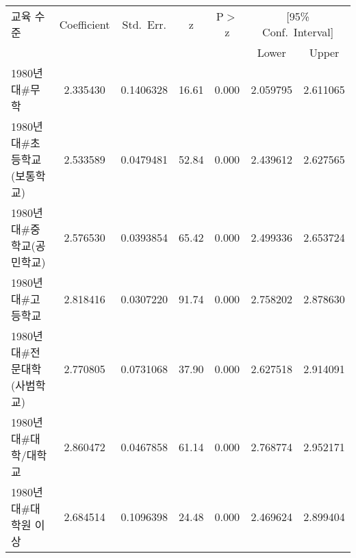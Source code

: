 \begin{tabular}{lcccccc}
\toprule
교육 수준 & Coefficient & Std.~Err. & z & P$>$z & \multicolumn{2}{c}{[95\% Conf.~Interval]} \\
\cmidrule(lr){6-7}
 &  &  &  &  & Lower & Upper \\
\midrule
1980년대\#무학 & 2.335430 & 0.1406328 & 16.61 & 0.000 & 2.059795 & 2.611065 \\
1980년대\#초등학교(보통학교) & 2.533589 & 0.0479481 & 52.84 & 0.000 & 2.439612 & 2.627565 \\
1980년대\#중학교(공민학교) & 2.576530 & 0.0393854 & 65.42 & 0.000 & 2.499336 & 2.653724 \\
1980년대\#고등학교 & 2.818416 & 0.0307220 & 91.74 & 0.000 & 2.758202 & 2.878630 \\
1980년대\#전문대학(사범학교) & 2.770805 & 0.0731068 & 37.90 & 0.000 & 2.627518 & 2.914091 \\
1980년대\#대학/대학교 & 2.860472 & 0.0467858 & 61.14 & 0.000 & 2.768774 & 2.952171 \\
1980년대\#대학원 이상 & 2.684514 & 0.1096398 & 24.48 & 0.000 & 2.469624 & 2.899404 \\
\bottomrule
\end{tabular}
